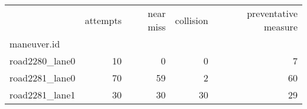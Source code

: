 \begin{tabular}{lrrrr}
\toprule
{} &  attempts &  near miss &  collision &  preventative measure \\
maneuver.id    &           &            &            &                       \\
\midrule
road2280\_lane0 &        10 &          0 &          0 &                     7 \\
road2281\_lane0 &        70 &         59 &          2 &                    60 \\
road2281\_lane1 &        30 &         30 &         30 &                    29 \\
\bottomrule
\end{tabular}
